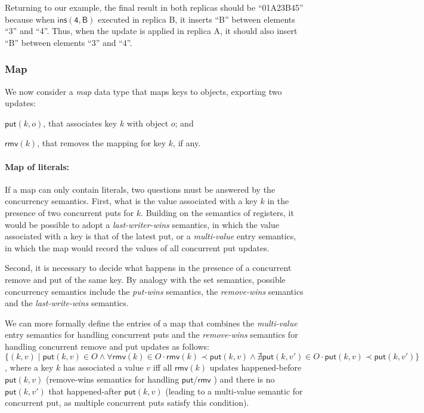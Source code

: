 \documentclass[12pt]{article}
\def\land{\mathrel{\wedge}}
\begin{document}
Returning to our example, the final result in both replicas should be ``01A23B45'' because 
when $\mathsf{ins(4,B)}$ executed in replica B, it inserts ``B'' between 
elements ``3'' and ``4''. Thus, when the update is applied in replica A, it 
should also insert ``B'' between elements ``3'' and ``4''.

\subsubsection{Map}
We now consider a \emph{map} data type that maps keys to objects, exporting
two updates:
\begin{inparaenum}[(i)]
\item $\mathsf{put}(k,o)$, that associates key $k$ with object $o$; and  
\item $\mathsf{rmv}(k)$, that removes the mapping for key $k$, if any.
\end{inparaenum}

\paragraph{Map of literals:}
If a map can only contain literals, two questions must be answered
by the concurrency semantics.
First, what is the value associated with a key $k$ in the presence of
two concurrent puts for $k$. Building on the semantics of 
registers, it would be possible to adopt a \emph{last-writer-wins}
semantics, in which the value associated with a key is that of the 
latest put, or a \emph{multi-value} entry semantics, in which the map
would record the values of all concurrent put updates.

Second, it is necessary to decide what happens in the presence of a 
concurrent remove and put of the same key. 
By analogy with the set semantics, 
possible concurrency semantics include the \emph{put-wins}
semantics, the \emph{remove-wins} semantics and the \emph{last-write-wins}
semantics.

We can more formally define the entries of a map that combines the 
\emph{multi-value} entry semantics for handling concurrent puts and 
the \emph{remove-wins} semantics for handling concurrent remove and put updates
as follows:
$\{(k,v) \mid \mathsf{put}(k,v) \in O \land \forall \mathsf{rmv}(k) \in O \cdot \mathsf{rmv}(k) \prec \mathsf{put}(k,v) \land \nexists \mathsf{put}(k,v') \in O \cdot \mathsf{put}(k,v) \prec \mathsf{put}(k,v')\}$,
where a key $k$ has associated a value $v$ iff all $\mathsf{rmv}(k)$ updates happened-before
$\mathsf{put}(k,v)$ (remove-wins semantics for handling $\mathsf{put}$/$\mathsf{rmv}$ ) and
there is no $\mathsf{put}(k,v')$ that happened-after $\mathsf{put}(k,v)$ (leading to a multi-value
semantic for concurrent put, as multiple concurrent puts satisfy this condition).
\end{document}
